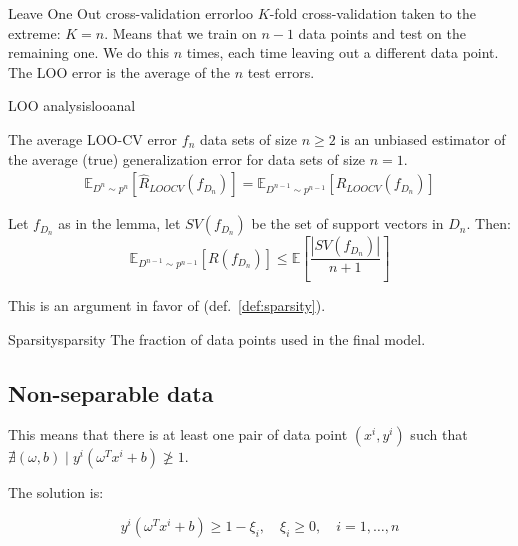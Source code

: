 \begin{definition}{Leave One Out cross-validation error}{loo}
	$K$-fold cross-validation taken to the extreme: $K=n$.
	Means that we train on $n-1$ data points and test on the remaining one.
	We do this $n$ times, each time leaving out a different data point.
	The LOO error is the average of the $n$ test errors.
\end{definition}

\begin{theorem}{LOO analysis}{looanal}

	\begin{lemma}{}{}
			The average LOO-CV error $f_n$ data sets of size $n \geq 2$
			is an unbiased estimator of the average (true) generalization
			error for data sets of size $n=1$.
		\begin{align*}
			\mathds{E}_{D^n \sim p^n}
			\left[ \hat{R}_{LOOCV}(f_{D_n}) \right] =
			\mathds{E}_{D^{n-1} \sim p^{n-1}} \left[{R_{LOOCV}(f_{D_n})} \right]
		\end{align*}
	\end{lemma}
	Let $f_{D_n}$ as in the lemma, let $SV(f_{D_n})$ be the set of
	support vectors in $D_n$. Then:
	\begin{equation*}
		\mathds{E}_{D^{n-1} \sim p^{n-1}} \left[{R(f_{D_n})} \right]
		\leq \mathds{E} \left[
			\frac{\left| SV(f_{D_n}) \right|}{n + 1}
			\right]
	\end{equation*}
  \tcblower
  \begin{note}
	  This is an argument in favor of  (def.~\ref{def:sparsity}).
  \end{note}
\end{theorem}

\begin{definition}{Sparsity}{sparsity}
	The fraction of data points used in the final model.
\end{definition}

\subsection*{Non-separable data}

This means that there is at least one pair of data point $(x^i, y^i)$
such that $\nexists (\omega, b) \mid y^i (\omega^T x^i + b) \ngeq 1$.

The solution is:

\begin{equation*}
	y^i (\omega^T x^i + b) \geq 1 - \xi_i, \quad \xi_i \geq 0,\quad
	i=1,\dots,n
\end{equation*}


